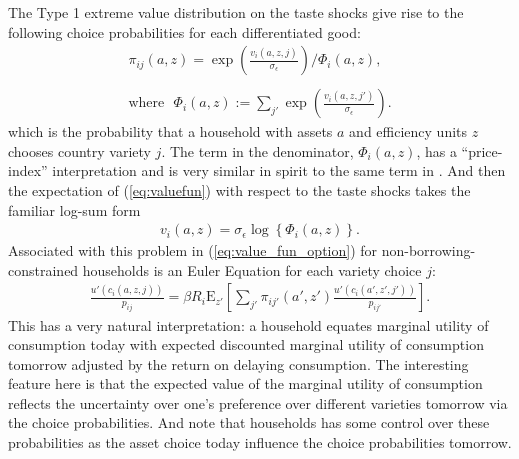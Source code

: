 \documentclass[12pt,pdftex]{article}
\begin{document}
\begin{onehalfspacing}
The Type 1 extreme value distribution on the taste shocks give rise to the following choice probabilities for each differentiated good:
\begin{align}
\pi_{ij}(a, z) = \exp \left( \frac{ v_{i}(a, z, j) }{\sigma_{\epsilon}} \right) \Bigg / \Phi_{i}(a,z), \label{eq:choice-prob} \\
\nonumber \\
\mbox{where} \ \ \ \Phi_{i}(a,z) := \sum_{j'} \exp \left( \frac{ v_{i}(a, z, j') }{\sigma_{\epsilon}} \right). \label{eq:big-phi}
\end{align}
which is the probability that a household with assets $a$ and efficiency units $z$ chooses country variety $j$. The term in the denominator, $\Phi_{i}(a,z)$, has a ``price-index'' interpretation and is very similar in spirit to the same term in \citet{eaton2002technology}. And then the expectation of (\ref{eq:valuefun}) with respect to the taste shocks takes the familiar log-sum form
\begin{align}
v_i(a, z) = \sigma_{\epsilon} \log \left\{ \Phi_{i}(a,z)  \right\}. \label{eq:log_sum}
\end{align}
Associated with this problem in (\ref{eq:value_fun_option}) for non-borrowing-constrained households is an Euler Equation for each variety choice $j$:
\begin{align}
\frac{u'(c_{i}(a, z, j))}{p_{ij}} = \beta R_{i} \mathrm{E}_{z'} \left[ \sum_{j'} \pi_{ij'}(a', z') \frac{u'(c_{i}(a', z', j'))}{p_{ij'}} \right].
\label{eq:euler_equation}
\end{align}
This has a very natural interpretation: a household equates marginal utility of consumption today with expected discounted marginal utility of consumption tomorrow adjusted by the return on delaying consumption. The interesting feature here is that the expected value of the marginal utility of consumption reflects the uncertainty over one's preference over different varieties tomorrow via the choice probabilities. And note that households has some control over these probabilities as the asset choice today influence the choice probabilities tomorrow.


\end{onehalfspacing}
\end{document}
